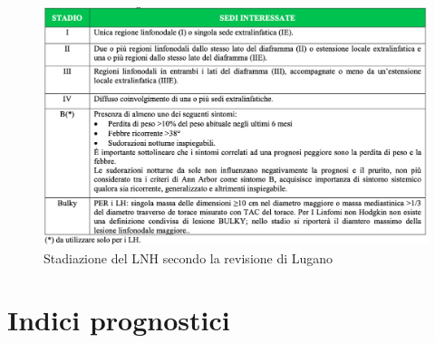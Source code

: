 \begin{figure}[H]
    \begin{center}
    \includegraphics[width=0.7\columnwidth]{img/LUGANOAIOM.png}
    \vspace{-3mm}
    \end{center}
    \caption{Stadiazione del LNH secondo la revisione di Lugano
    \cite{AIOM}}
    
\end{figure}

\section{Indici prognostici}

